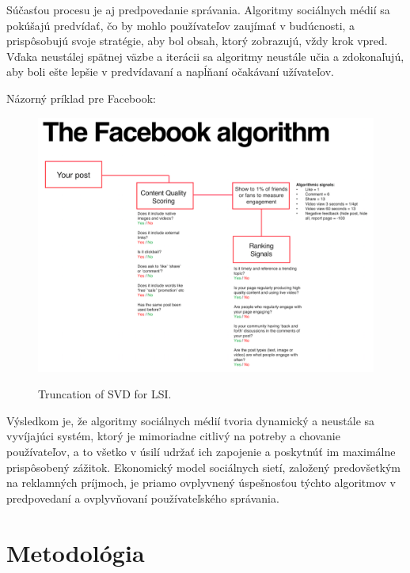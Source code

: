 \documentclass[12pt,twoside,slovak,a4paper]{article}
\begin{document}
Súčasťou procesu je aj predpovedanie správania. Algoritmy sociálnych médií sa pokúšajú predvídať, čo by mohlo používateľov zaujímať v budúcnosti, a prispôsobujú svoje stratégie, aby bol obsah, ktorý zobrazujú, vždy krok vpred. Vďaka neustálej spätnej väzbe a iterácii sa algoritmy neustále učia a zdokonaľujú, aby boli ešte lepšie v predvídavaní a napĺňaní očakávaní užívateľov.


Názorný príklad pre Facebook:

\begin{figure}[h]
    \centering
    \includegraphics[scale=0.6]{dd3ba30631ea2b442e37f156fe8b0189.PNG} 
     \cite{kontostathis2006}\caption{Truncation of SVD for LSI.}
    \label{fig:truncation}
\end{figure}


Výsledkom je, že algoritmy sociálnych médií tvoria dynamický a neustále sa vyvíjajúci systém, ktorý je mimoriadne citlivý na potreby a chovanie používateľov, a to všetko v úsilí udržať ich zapojenie a poskytnúť im maximálne prispôsobený zážitok. Ekonomický model sociálnych sietí, založený predovšetkým na reklamných príjmoch, je priamo ovplyvnený úspešnosťou týchto algoritmov v predpovedaní a ovplyvňovaní používateľského správania.





\section{Metodológia}
\end{document}
